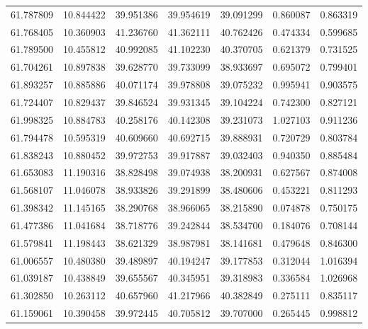 \begin{tabular}{rrrrrrr}
 61.787809 &  10.844422 &         39.951386 &         39.954619 &         39.091299 &  0.860087 &  0.863319 \\
 61.768405 &  10.360903 &         41.236760 &         41.362111 &         40.762426 &  0.474334 &  0.599685 \\
 61.789500 &  10.455812 &         40.992085 &         41.102230 &         40.370705 &  0.621379 &  0.731525 \\
 61.704261 &  10.897838 &         39.628770 &         39.733099 &         38.933697 &  0.695072 &  0.799401 \\
 61.893257 &  10.885886 &         40.071174 &         39.978808 &         39.075232 &  0.995941 &  0.903575 \\
 61.724407 &  10.829437 &         39.846524 &         39.931345 &         39.104224 &  0.742300 &  0.827121 \\
 61.998325 &  10.884783 &         40.258176 &         40.142308 &         39.231073 &  1.027103 &  0.911236 \\
 61.794478 &  10.595319 &         40.609660 &         40.692715 &         39.888931 &  0.720729 &  0.803784 \\
 61.838243 &  10.880452 &         39.972753 &         39.917887 &         39.032403 &  0.940350 &  0.885484 \\
 61.653083 &  11.190316 &         38.828498 &         39.074938 &         38.200931 &  0.627567 &  0.874008 \\
 61.568107 &  11.046078 &         38.933826 &         39.291899 &         38.480606 &  0.453221 &  0.811293 \\
 61.398342 &  11.145165 &         38.290768 &         38.966065 &         38.215890 &  0.074878 &  0.750175 \\
 61.477386 &  11.041684 &         38.718776 &         39.242844 &         38.534700 &  0.184076 &  0.708144 \\
 61.579841 &  11.198443 &         38.621329 &         38.987981 &         38.141681 &  0.479648 &  0.846300 \\
 61.006557 &  10.480380 &         39.489897 &         40.194247 &         39.177853 &  0.312044 &  1.016394 \\
 61.039187 &  10.438849 &         39.655567 &         40.345951 &         39.318983 &  0.336584 &  1.026968 \\
 61.302850 &  10.263112 &         40.657960 &         41.217966 &         40.382849 &  0.275111 &  0.835117 \\
 61.159061 &  10.390458 &         39.972445 &         40.705812 &         39.707000 &  0.265445 &  0.998812 \\

\end{tabular}
